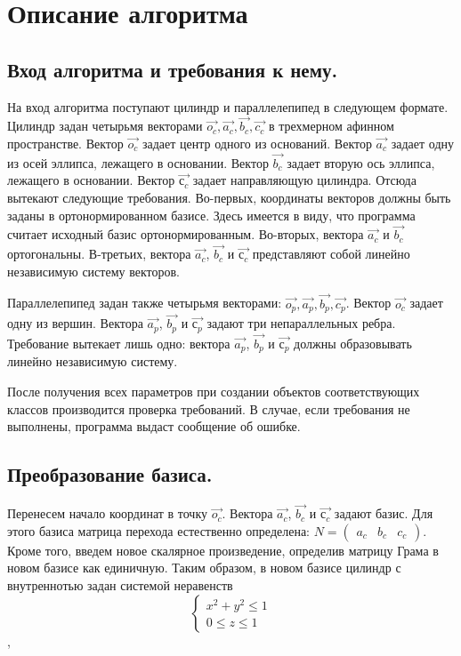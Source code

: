 \documentclass[pdftex,ptm,12pt,a4paper]{report}
\begin{document}
\chapter{Описание алгоритма}
    \section{Вход алгоритма и требования к нему.}
      На вход алгоритма поступают цилиндр и параллелепипед в следующем формате.
      Цилиндр задан четырьмя векторами $\vec{o_c}, \vec{a_c}, \vec{b_c}, \vec{c_c}$ в трехмерном афинном пространстве.
      Вектор $\vec{o_c}$ задает центр одного из оснований.
      Вектор $\vec{a_c}$ задает одну из осей эллипса, лежащего в основании.
      Вектор $\vec{b_c}$ задает вторую ось эллипса, лежащего в основании.
      Вектор $\vec{с_c}$ задает направляющую цилиндра.
      Отсюда вытекают следующие требования.
      Во-первых, координаты векторов должны быть заданы в ортонормированном базисе. 
      Здесь имеется в виду, что программа считает исходный базис ортонормированным.
      Во-вторых, вектора $\vec{a_c}$ и $\vec{b_c}$ ортогональны.
      В-третьих, вектора $\vec{a_c}$, $\vec{b_c}$ и $\vec{с_c}$ представляют собой линейно независимую систему векторов.

      Параллелепипед задан также четырьмя векторами: $\vec{o_p}, \vec{a_p}, \vec{b_p}, \vec{c_p}$.
      Вектор $\vec{o_c}$ задает одну из вершин.
      Вектора $\vec{a_p}$, $\vec{b_p}$ и $\vec{с_p}$ задают три непараллельных ребра.
      Требование вытекает лишь одно: вектора $\vec{a_p}$, $\vec{b_p}$ и $\vec{с_p}$ должны образовывать линейно независимую систему.

      После получения всех параметров при создании объектов соответствующих классов производится проверка требований. 
      В случае, если требования не выполнены, программа выдаст сообщение об ошибке.
\section{Преобразование базиса.}
      Перенесем начало координат в точку $\vec{o_c}$. 
      Вектора $\vec{a_c}$, $\vec{b_c}$ и $\vec{с_c}$ задают базис.
      Для этого базиса матрица перехода естественно определена:
      $N = \begin{pmatrix} {a_c} & {b_c} & c_{c} \end{pmatrix}$.
      Кроме того, введем новое скалярное произведение, определив матрицу Грама в новом базисе как единичную.
      Таким образом, в новом базисе цилиндр с внутреннотью задан системой неравенств 
      \begin{equation}\label{cnb}
          \begin{cases}
          x^2 + y^2   \le  1  \\
          0 \le  z   \le  1
          \end{cases}
      \end{equation}, 
\end{document}
